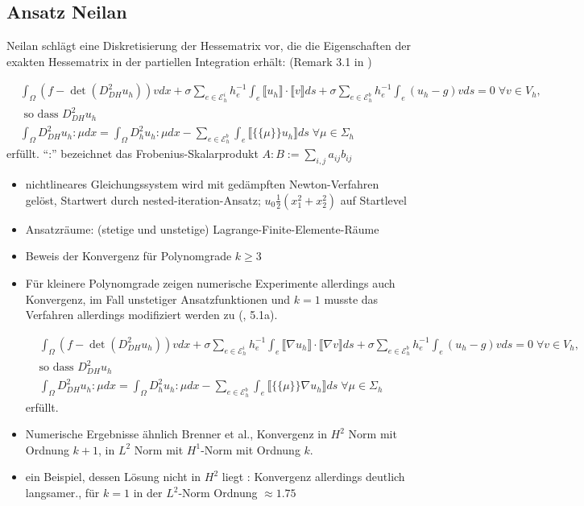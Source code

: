 \documentclass[a4paper,11pt]{article}
\newcommand{\bigEps}{\mathcal{E}}
\begin{document}
\subsection*{Ansatz Neilan}
Neilan schlägt eine Diskretisierung der Hessematrix vor, die die Eigenschaften der exakten Hessematrix in der partiellen Integration erhält: (Remark 3.1 in \cite{Neilan2014})

\begin{align*}
	&\int_\Omega \left(  f- \det(D^2_{DH} u_h)   \right) v dx
	                     + \sigma \sum\limits_{e \in \bigEps_h^i} h_e^{-1} \int_e \llbracket u_h \rrbracket \cdot \llbracket v \rrbracket  ds
	                     + \sigma \sum\limits_{e \in \bigEps_h^b} h_e^{-1} \int_e (u_h - g) v ds = 0 \; \forall v \in V_h, \\   
	  &\text{ so dass  } D^2_{DH} u_h \\
	  &\int_{\Omega} D^2_{DH} u_h : \mu dx = \int_\Omega D^2_h u_h : \mu dx 
	                        -  \sum\limits_{e \in \bigEps_h^b} \int_e \llbracket  \{\{\mu\}\} u_h \rrbracket ds \; \forall \mu \in \Sigma_h
\end{align*}
erfüllt. ``:'' bezeichnet das Frobenius-Skalarprodukt $A:B := \sum_{i,j} a_{ij} b_{ij}$

\begin{itemize}
	\item nichtlineares Gleichungssystem wird mit gedämpften Newton-Verfahren gelöst, Startwert durch nested-iteration-Ansatz; $u_0 \frac 12 (x_1^2 + x_2^2 )$ auf Startlevel
	\item Ansatzräume: (stetige und unstetige) Lagrange-Finite-Elemente-Räume
	\item Beweis der Konvergenz für Polynomgrade $k \geq 3$ 
	\item Für kleinere Polynomgrade zeigen numerische Experimente allerdings auch Konvergenz,
	im Fall unstetiger Ansatzfunktionen und $k=1$ musste das Verfahren allerdings modifiziert werden zu (\cite{Neilan2014}, 5.1a). 

\begin{align*}
	&\int_\Omega \left(  f- \det(D^2_{DH} u_h)   \right) v dx
	                     + \sigma \sum\limits_{e \in \bigEps_h^i} h_e^{-1} \int_e \llbracket \nabla u_h \rrbracket \cdot \llbracket \nabla v \rrbracket  ds
	                     + \sigma \sum\limits_{e \in \bigEps_h^b} h_e^{-1} \int_e (u_h - g) v ds = 0 \; \forall v \in V_h, \\   
	  &\text{so dass  } D^2_{DH} u_h \\
	 & \int_{\Omega} D^2_{DH} u_h : \mu dx = \int_\Omega D^2_h u_h : \mu dx 
	                        -  \sum\limits_{e \in \bigEps_h^b} \int_e \llbracket  \{\{\mu\}\} \nabla u_h \rrbracket ds \; \forall \mu \in \Sigma_h 
\end{align*}
erfüllt.

	\item Numerische Ergebnisse ähnlich Brenner et al., Konvergenz in $H^2$ Norm mit Ordnung $k+1$,  in $L^2$ Norm mit $H^1$-Norm mit Ordnung $k$.
	\item ein Beispiel, dessen Lösung nicht in $H^2$ liegt : Konvergenz allerdings deutlich langsamer., für  $k=1$ in der $L^2$-Norm Ordnung $ \approx 1.75$ 
\end{itemize}




\end{document}
